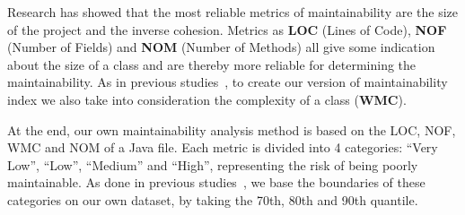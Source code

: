Research has showed \cite{sjoberg2012questioning} that the most reliable metrics of maintainability are the size of the project and the inverse cohesion. Metrics as \textbf{LOC} (Lines of Code), \textbf{NOF} (Number of Fields) and \textbf{NOM} (Number of Methods) all give some indication about the size of a class and are thereby more reliable for determining the maintainability. As in previous studies~\cite{citationneeded}, to create our version of maintainability index we also take into consideration the complexity of a class (\textbf{WMC}).

At the end, our own maintainability analysis method is based on the LOC, NOF, WMC and NOM of a Java file. Each metric is divided into 4 categories: ``Very Low'', ``Low'', ``Medium'' and ``High'', representing the risk of being poorly maintainable. As done in previous studies~\cite{alves2010deriving}, we base the boundaries of these categories on our own dataset, by taking the 70th, 80th and 90th quantile.


